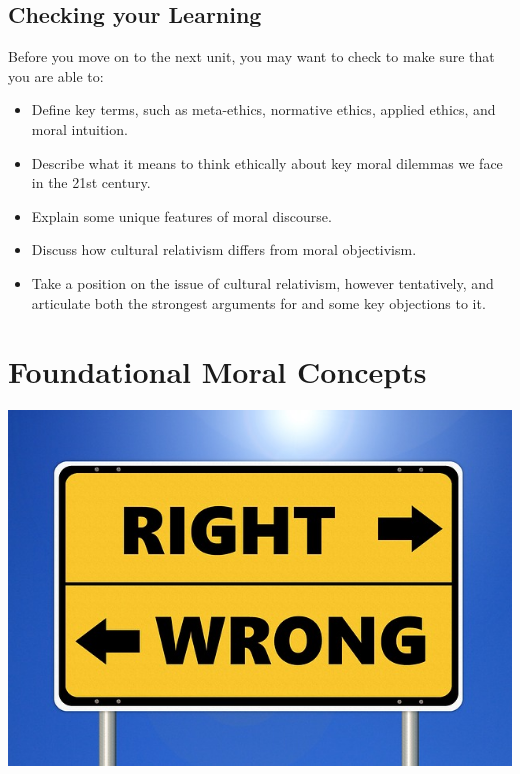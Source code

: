 \documentclass[
]{book}
\providecommand{\tightlist}{%
  \setlength{\itemsep}{0pt}\setlength{\parskip}{0pt}}
\begin{document}
\hypertarget{checking-your-learning}{%
\section*{Checking your Learning}\label{checking-your-learning}}

\begin{progress}
Before you move on to the next unit, you may want to check to make sure that you are able to:

\begin{itemize}
\tightlist
\item
  Define key terms, such as meta-ethics, normative ethics, applied ethics, and moral intuition.\\
\item
  Describe what it means to think ethically about key moral dilemmas we face in the 21st century.\\
\item
  Explain some unique features of moral discourse.\\
\item
  Discuss how cultural relativism differs from moral objectivism.\\
\item
  Take a position on the issue of cultural relativism, however tentatively, and articulate both the strongest arguments for and some key objections to it.
\end{itemize}
\end{progress}

\hypertarget{foundational-moral-concepts}{%
\chapter{Foundational Moral Concepts}\label{foundational-moral-concepts}}

\includegraphics{assets/unit_2/ethics-2991600_640.jpg}
\end{document}
